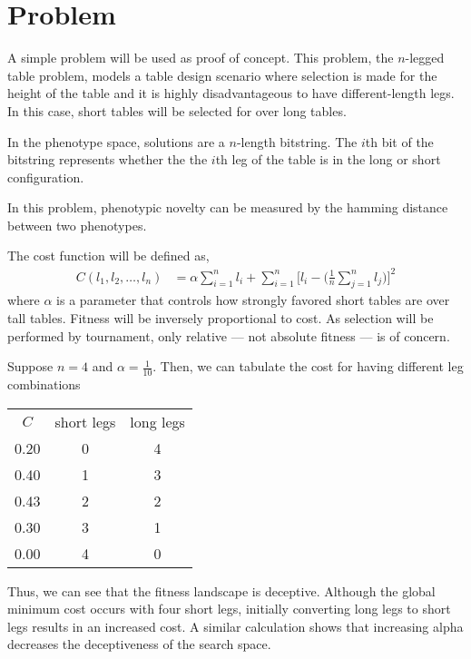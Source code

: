\section{Problem} \label{sec:problem}

A simple problem will be used as proof of concept.
This problem, the $n$-legged table problem, models a table design scenario where selection is made for the height of the table and it is highly disadvantageous to have different-length legs.
In this case, short tables will be selected for over long tables.

In the phenotype space, solutions are a $n$-length bitstring.
The $i$th bit of the bitstring represents whether the the $i$th leg of the table is in the long or short configuration.

In this problem, phenotypic novelty can be measured by the hamming distance between two phenotypes.

The cost function will be defined as,
\begin{align*}
C(l_1, l_2, \ldots, l_n)
&=
\alpha \sum_{i = 1}^{n} l_i
+
\sum_{i=1}^n \Big[l_i - \Big(\frac{1}{n} \sum_{j=1}^n l_j\Big)\Big]^2
\end{align*}
where $\alpha$ is a parameter that controls how strongly favored short tables are over tall tables.
Fitness will be inversely proportional to cost.
As selection will be performed by tournament, only relative --- not absolute fitness --- is of concern.

Suppose $n=4$ and $\alpha = \frac{1}{10}$.
Then, we can tabulate the cost for having different leg combinations
\begin{center}
\begin{tabular}{ c c c }
 $C$ & short legs & long legs \\
 0.20 & 0 & 4 \\
 0.40 & 1 & 3 \\
 0.43 & 2 & 2 \\
 0.30 & 3 & 1 \\
 0.00 & 4 & 0
\end{tabular}
\end{center}
Thus, we can see that the fitness landscape is deceptive.
Although the global minimum cost occurs with four short legs, initially converting long legs to short legs results in an increased cost.
A similar calculation shows that increasing alpha decreases the deceptiveness of the search space.
